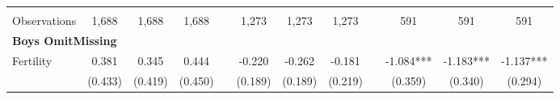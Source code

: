 \begin{landscape}
\begin{table}[htpb!]
\begin{center}
\begin{tabular}{lcccp{2mm}cccp{2mm}ccc}
\begin{footnotesize}\end{footnotesize}&\begin{footnotesize}\end{footnotesize}&\begin{footnotesize}\end{footnotesize}&\begin{footnotesize}\end{footnotesize}&\begin{footnotesize}\end{footnotesize}&\begin{footnotesize}\end{footnotesize}&\begin{footnotesize}\end{footnotesize}&\begin{footnotesize}\end{footnotesize}&\begin{footnotesize}\end{footnotesize}&\begin{footnotesize}\end{footnotesize}&\begin{footnotesize}\end{footnotesize}&\begin{footnotesize}\end{footnotesize}\\Observations&1,688&1,688&1,688&&1,273&1,273&1,273&&591&591&591\\
\multicolumn{12}{l}{\textbf{Boys OmitMissing}}\\ 
Fertility&0.381&0.345&0.444&&-0.220&-0.262&-0.181&&-1.084***&-1.183***&-1.137***\\
&(0.433)&(0.419)&(0.450)&&(0.189)&(0.189)&(0.219)&&(0.359)&(0.340)&(0.294)\\

\end{tabular}
\end{center}
\end{table}
\end{landscape}
